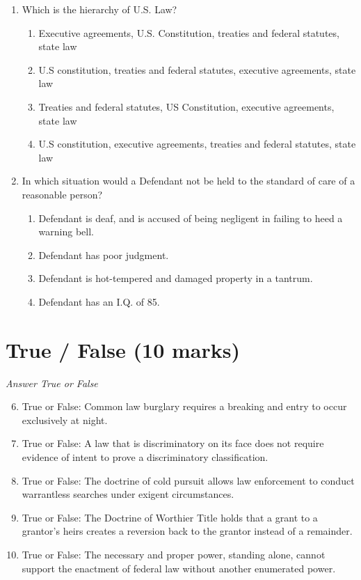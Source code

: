 \documentclass[12pt]{article}
\begin{document}
\begin{enumerate}[label=\arabic*.]
\item Which is the hierarchy of U.S. Law?
\begin{enumerate}[label=(\alph*)]
    \item Executive agreements, U.S. Constitution, treaties and federal statutes, state law
    \item U.S constitution, treaties and federal statutes, executive agreements, state law
    \item Treaties and federal statutes, US Constitution, executive agreements, state law
    \item U.S constitution, executive agreements, treaties and federal statutes, state law
\end{enumerate}
\item In which situation would a Defendant not be held to the standard of care of a reasonable person?
\begin{enumerate}[label=(\alph*)]
    \item Defendant is deaf, and is accused of being negligent in failing to heed a warning bell.
    \item Defendant has poor judgment.
    \item Defendant is hot-tempered and damaged property in a tantrum.
    \item Defendant has an I.Q. of 85.
\end{enumerate}
\end{enumerate}

\section*{True / False (10 marks)}
\textit{Answer True or False}
\begin{enumerate}[label=\arabic*.]
\setcounter{enumi}{5}
\item True or False: Common law burglary requires a breaking and entry to occur exclusively at night.
\item True or False: A law that is discriminatory on its face does not require evidence of intent to prove a discriminatory classification.
\item True or False: The doctrine of cold pursuit allows law enforcement to conduct warrantless searches under exigent circumstances.
\item True or False: The Doctrine of Worthier Title holds that a grant to a grantor's heirs creates a reversion back to the grantor instead of a remainder.
\item True or False: The necessary and proper power, standing alone, cannot support the enactment of federal law without another enumerated power.
\end{enumerate}
\end{document}
